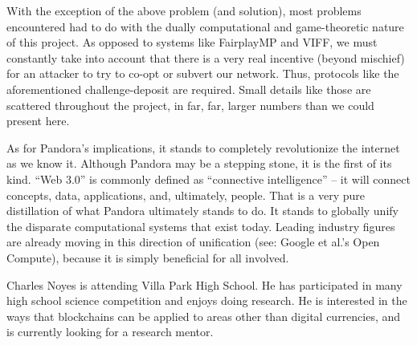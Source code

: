 \documentclass[journal,11pt]{IEEEtran}
\begin{document}
\par With the exception of the above problem (and solution), most problems encountered had to do with the dually computational and game-theoretic nature of this project. As opposed to systems like FairplayMP and VIFF, we must constantly take into account that there is a very real incentive (beyond mischief) for an attacker to try to co-opt or subvert our network. Thus, protocols like the aforementioned challenge-deposit are required. Small details like those are scattered throughout the project, in far, far, larger numbers than we could present here.

\par As for Pandora’s implications, it stands to completely revolutionize the internet as we know it. Although Pandora may be a stepping stone, it is the first of its kind. “Web 3.0” is commonly defined as “connective intelligence” – it will connect concepts, data, applications, and, ultimately, people. That is a very pure distillation of what Pandora ultimately stands to do. It stands to globally unify the disparate computational systems that exist today. Leading industry figures are already moving in this direction of unification (see: Google et al.’s Open Compute), because it is simply beneficial for all involved.


\begin{IEEEbiographynophoto}{Charles Noyes}
is  attending Villa Park High School. He has participated in many high school science competition and enjoys doing research. He is interested in the ways that blockchains can be applied to areas other than digital currencies, and is currently looking for a research mentor.
\end{IEEEbiographynophoto}



\end{document}
